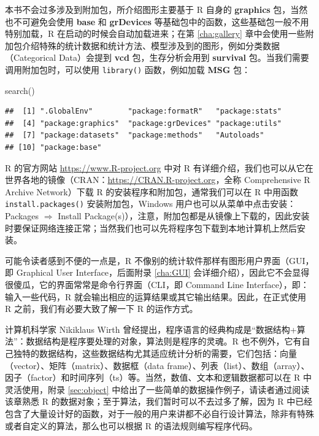 \documentclass[
  b5paper,
  UTF8,twoside]{book}
\newenvironment{Shaded}{\begin{snugshade}}{\end{snugshade}}
\newcommand{\FunctionTok}[1]{\textcolor[rgb]{0.00,0.00,0.00}{#1}}
\newcommand{\NormalTok}[1]{#1}
\begin{document}
本书不会过多涉及到附加包，所介绍图形主要基于 R 自身的 \textbf{graphics} 包，当然也不可避免会使用 \textbf{base} 和 \textbf{grDevices} 等基础包中的函数，这些基础包一般不用特别加载，R 在启动的时候会自动加载进来；在第 \ref{cha:gallery} 章中会使用一些附加包介绍特殊的统计数据和统计方法、模型涉及到的图形，例如分类数据（Categorical Data）会提到 \textbf{vcd} 包，生存分析会用到 \textbf{survival} 包。当我们需要调用附加包时，可以使用 \texttt{library()} 函数，例如加载 \textbf{MSG} 包：

\begin{Shaded}
\begin{Highlighting}[]
\FunctionTok{search}\NormalTok{()}
\end{Highlighting}
\end{Shaded}

\begin{verbatim}
##  [1] ".GlobalEnv"        "package:formatR"   "package:stats"    
##  [4] "package:graphics"  "package:grDevices" "package:utils"    
##  [7] "package:datasets"  "package:methods"   "Autoloads"        
## [10] "package:base"
\end{verbatim}

R 的官方网站 \url{https://www.R-project.org} 中对 R 有详细介绍，我们也可以从它在世界各地的镜像（CRAN：\url{https://CRAN.R-project.org}，全称 Comprehensive R Archive Network）下载 R 的安装程序和附加包，通常我们可以在 R 中用函数 \texttt{install.packages()} 安装附加包，Windows 用户也可以从菜单中点击安装：Packages \(\Rightarrow\) Install Package(s)），注意，附加包都是从镜像上下载的，因此安装时要保证网络连接正常；当然我们也可以先将程序包下载到本地计算机上然后安装。

可能令读者感到不便的一点是，R 不像别的统计软件那样有图形用户界面（GUI，即 Graphical User Interface，后面附录 \ref{cha:GUI} 会详细介绍），因此它不会显得很傻瓜，它的界面常常是命令行界面（CLI，即 Command Line Interface），即：输入一些代码，R 就会输出相应的运算结果或其它输出结果。因此，在正式使用 R 之前，我们有必要大致了解一下 R 的运作方式。

计算机科学家 Nikiklaus Wirth 曾经提出，程序语言的经典构成是``数据结构+算法''：数据结构是程序要处理的对象，算法则是程序的灵魂。R 也不例外，它有自己独特的数据结构，这些数据结构尤其适应统计分析的需要，它们包括：向量（vector）、矩阵（matrix）、数据框（data frame）、列表（list）、数组（array）、因子（factor）和时间序列（ts）等。当然，数值、文本和逻辑数据都可以在 R 中灵活使用，附录 \ref{sec:object} 中给出了一些简单的数据操作例子，请读者通过阅读该章熟悉 R 的数据对象；至于算法，我们暂时可以不去过多了解，因为 R 中已经包含了大量设计好的函数，对于一般的用户来讲都不必自行设计算法，除非有特殊或者自定义的算法，那么也可以根据 R 的语法规则编写程序代码。
\end{document}
